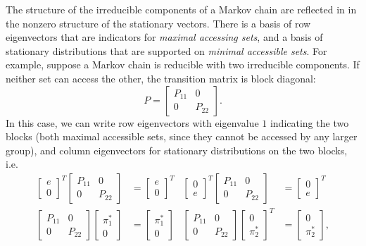 \documentclass[12pt, leqno]{article} %
\begin{document}

The structure of the irreducible components of a Markov chain are
reflected in in the nonzero structure of the stationary vectors.
There is a basis of row eigenvectors that are indicators for
{\em maximal accessing sets}, and a basis of stationary distributions
that are supported on {\em minimal accessible sets}.  For example,
suppose a Markov chain is reducible with two irreducible components.
If neither set can access the other, the transition matrix is block
diagonal:
\[
  P = \begin{bmatrix} P_{11} & 0 \\ 0 & P_{22} \end{bmatrix}.
\]
In this case, we can write row eigenvectors with eigenvalue $1$
indicating the two blocks (both maximal accessible sets,
since they cannot be accessed by any larger group), and column
eigenvectors for stationary distributions on the two blocks, i.e.
\begin{align*}
  \begin{bmatrix} e \\ 0 \end{bmatrix}^T
  \begin{bmatrix} P_{11} & 0 \\ 0 & P_{22} \end{bmatrix} &= 
  \begin{bmatrix} e \\ 0 \end{bmatrix}^T &
  \begin{bmatrix} 0 \\ e \end{bmatrix}^T
  \begin{bmatrix} P_{11} & 0 \\ 0 & P_{22} \end{bmatrix} &= 
  \begin{bmatrix} 0 \\ e \end{bmatrix}^T \\
  \begin{bmatrix} P_{11} & 0 \\ 0 & P_{22} \end{bmatrix}
  \begin{bmatrix} \pi_1^* \\ 0 \end{bmatrix} &=
  \begin{bmatrix} \pi_1^* \\ 0 \end{bmatrix} &
  \begin{bmatrix} P_{11} & 0 \\ 0 & P_{22} \end{bmatrix}
  \begin{bmatrix} 0 \\ \pi_2^* \end{bmatrix}^T &=
  \begin{bmatrix} 0 \\ \pi_2^* \end{bmatrix},
\end{align*}
\end{document}

